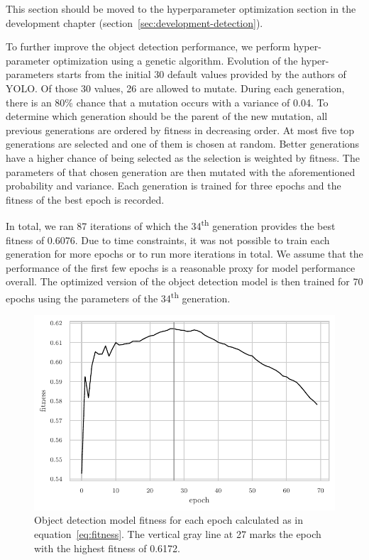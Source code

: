 \documentclass[draft,final]{vutinfth} %
\begin{document}
This section should be moved to the hyperparameter optimization
section in the development chapter
(section~\ref{sec:development-detection}).

To further improve the object detection performance, we perform
hyper-parameter optimization using a genetic algorithm. Evolution of
the hyper-parameters starts from the initial 30 default values
provided by the authors of YOLO. Of those 30 values, 26 are allowed to
mutate. During each generation, there is an 80\% chance that a
mutation occurs with a variance of 0.04. To determine which generation
should be the parent of the new mutation, all previous generations are
ordered by fitness in decreasing order. At most five top generations
are selected and one of them is chosen at random. Better generations
have a higher chance of being selected as the selection is weighted by
fitness. The parameters of that chosen generation are then mutated
with the aforementioned probability and variance. Each generation is
trained for three epochs and the fitness of the best epoch is
recorded.

In total, we ran 87 iterations of which the 34\textsuperscript{th}
generation provides the best fitness of 0.6076. Due to time
constraints, it was not possible to train each generation for more
epochs or to run more iterations in total. We assume that the
performance of the first few epochs is a reasonable proxy for model
performance overall. The optimized version of the object detection
model is then trained for 70 epochs using the parameters of the
34\textsuperscript{th} generation.

\begin{figure}
  \centering
  \includegraphics{graphics/model_fitness_final.pdf}
  \caption[Optimized object detection fitness per epoch.]{Object
    detection model fitness for each epoch calculated as in
    equation~\ref{eq:fitness}. The vertical gray line at 27 marks the
    epoch with the highest fitness of 0.6172.}
  \label{fig:hyp-opt-fitness}
\end{figure}
\end{document}
